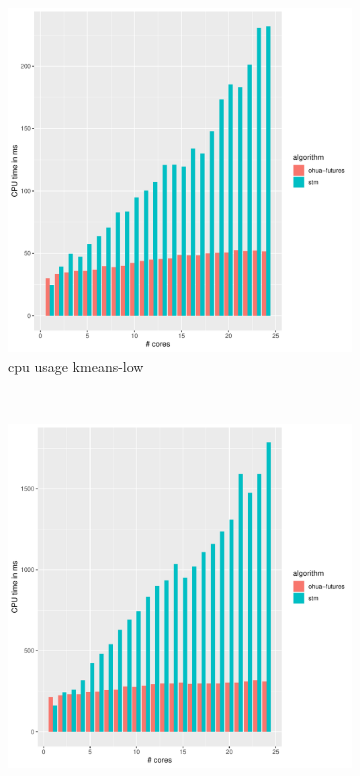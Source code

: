 \begin{figure}
    \begin{subfigure}[t]{.32\textwidth}
        \includegraphics[width=\textwidth,keepaspectratio]{gfx/results/kmeans/kmeans-low_cpu}
        \caption{cpu usage kmeans-low}%
    \end{subfigure}%
    ~
    \begin{subfigure}[t]{.32\textwidth}
        \includegraphics[width=\textwidth,keepaspectratio]{gfx/results/kmeans/kmeans-low+_cpu}

\end{subfigure}
\end{figure}
